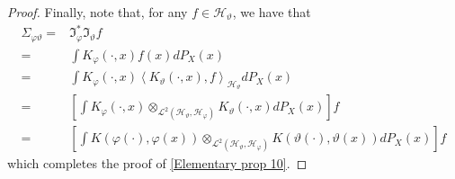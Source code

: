 \documentclass{article} %
\newcommand{\I}{\mathfrak{I}}
\newcommand{\HS}{\mathcal{L}^{2}}
\newcommand{\rep}{\varphi}
\newcommand{\Hrep}{\mathcal{H}_{\varphi}}
\newcommand{\Irep}{\I_{\rep}}
\newcommand{\Irepad}{\Irep^{*}}
\newcommand{\inprod}[1]{\left \langle #1 \right\rangle}
\theoremstyle{plain}
\begin{document}
\begin{proof}
   Finally, note that, for any $f \in \mathcal{H}_{\vartheta}$, we have that \begin{equation*}
   \begin{aligned}
   \Sigma_{\rep\vartheta} =& \Irepad \mathfrak{I}_{\vartheta} f\\
   =&  \int K_{\rep}(\cdot,x) f(x) dP_{X}(x)\\
   =& \int K_{\rep}(\cdot,x) \inprod{ K_{\vartheta}(\cdot,x),f}_{\mathcal{H}_{\vartheta}} dP_{X}(x)\\
   =&  \left[\int K_{\rep}(\cdot,x) \otimes_{\HS(\mathcal{H}_{\vartheta},\Hrep)}  K_{\vartheta}(\cdot,x) dP_{X}(x)\right]f \\
   =& \left[\int K(\rep(\cdot),\rep(x)) \otimes_{\HS(\mathcal{H}_{\vartheta},\Hrep)}  K(\vartheta(\cdot),\vartheta(x)) dP_{X}(x) \right]f
   \end{aligned}
   \end{equation*}
    which completes the proof of \ref{Elementary prop 10}.
\end{proof}
\end{document}
